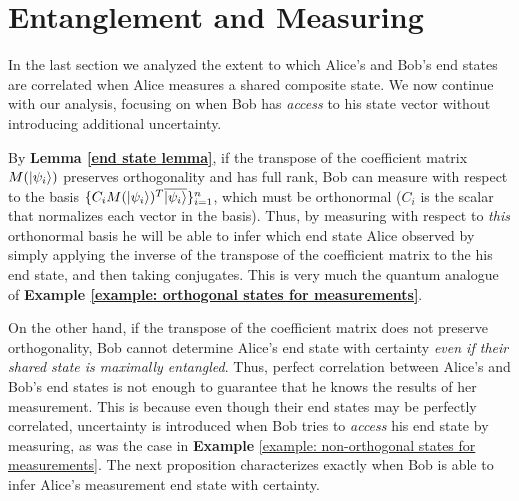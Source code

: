 \pagebreak

\section{Entanglement and Measuring}
\label{Section 6.2}
In the last section we analyzed the extent to which Alice's and Bob's end states are correlated when Alice measures a shared composite state. We now continue with our analysis, focusing on when Bob has {\emph{access}} to his state vector without introducing additional uncertainty. 

By \textbf{Lemma \ref{end state lemma}}, if the transpose of the coefficient matrix $M(\ket{\psi_i})$ preserves orthogonality and has full rank, Bob can measure with respect to the basis $\{C_i M(\ket{\psi_i})^T \overline{\ket{\psi_i}}\}_{i=1}^n$, which must be orthonormal ($C_i$ is the scalar that normalizes each vector in the basis). Thus, by measuring with respect to {\emph{this}} orthonormal basis he will be able to infer which end state Alice observed by simply applying the inverse of the transpose of the coefficient matrix to the his end state, and then taking conjugates. This is very much the quantum analogue of {\bf{Example} \ref{example: orthogonal states for measurements}}.

On the other hand, if the transpose of the coefficient matrix does not preserve orthogonality, Bob cannot determine Alice's end state with certainty {\emph{even if their shared state is maximally entangled}}.  Thus, perfect correlation between Alice's and Bob's end states is not enough to guarantee that he knows the results of her measurement.  This is because even though their end states may be perfectly correlated, uncertainty is introduced when Bob tries to {\emph{access}} his end state by measuring, as was the case in {\bf{Example}} \ref{example: non-orthogonal states for measurements}.  The next proposition characterizes exactly when Bob is able to infer Alice's measurement end state with certainty.  

